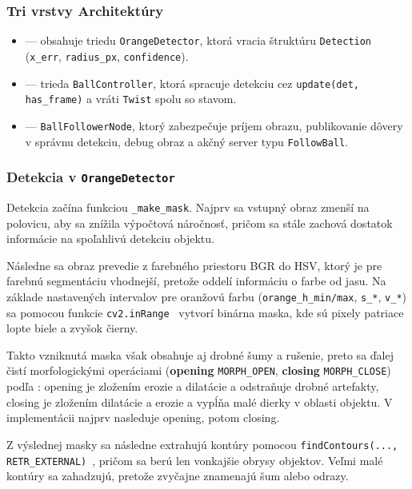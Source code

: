         \subsubsection*{Tri vrstvy Architektúry}
      
        \begin{itemize}
          \item {} --- obsahuje triedu \texttt{OrangeDetector}, ktorá vracia štruktúru \texttt{Detection} (\texttt{x\_err}, \texttt{radius\_px}, \texttt{confidence}).
          \item {} --- trieda \texttt{BallController}, ktorá spracuje detekciu cez \texttt{update(det, has\_frame)} a vráti \texttt{Twist} spolu so stavom.
          \item {} --- \texttt{BallFollowerNode}, ktorý zabezpečuje príjem obrazu, publikovanie dôvery v správnu detekciu, debug obraz a akčný server typu \texttt{FollowBall}.
        \end{itemize}
      
        \subsubsection*{Detekcia v \texttt{OrangeDetector}}
      
        Detekcia začína funkciou \texttt{\_make\_mask}. Najprv sa vstupný obraz zmenší na polovicu, aby sa znížila výpočtová náročnosť, pričom sa stále zachová dostatok informácie na spoľahlivú detekciu objektu.
      
        Následne sa obraz prevedie z farebného priestoru BGR do HSV, ktorý je pre farebnú segmentáciu vhodnejší, pretože oddelí informáciu o farbe od jasu. Na základe nastavených intervalov pre oranžovú farbu (\texttt{orange\_h\_min/max}, \texttt{s\_*}, \texttt{v\_*}) sa pomocou funkcie \texttt{cv2.inRange}~\cite{opencv_inrange_tutorial} vytvorí binárna maska, kde sú pixely patriace lopte biele a zvyšok čierny.
      
        Takto vzniknutá maska však obsahuje aj drobné šumy a rušenie, preto sa ďalej čistí morfologickými operáciami (\textbf{opening} \texttt{MORPH\_OPEN}, \textbf{closing} \texttt{MORPH\_CLOSE}) podľa \cite{opencv_morphology_tutorial}: opening je zložením erozie a dilatácie a odstraňuje drobné artefakty, closing je zložením dilatácie a erozie a vypĺňa malé dierky v oblasti objektu. V implementácii najprv nasleduje opening, potom closing.
      
        Z výslednej masky sa následne extrahujú kontúry pomocou \texttt{findContours(..., RETR\_EXTERNAL)}~\cite{opencv_contours_tutorial}, pričom sa berú len vonkajšie obrysy objektov. Veľmi malé kontúry sa zahadzujú, pretože zvyčajne znamenajú šum alebo odrazy.
      
